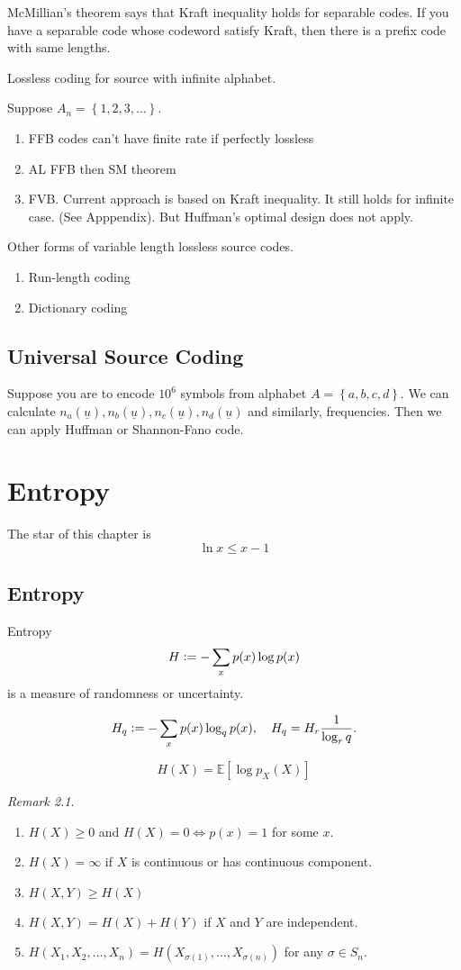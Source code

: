 \documentclass{report}
\newcommand{\set}[1]{\left\lbrace #1 \right\rbrace}
\newcommand{\defeq}{\vcentcolon=}
\theoremstyle{definition}
\theoremstyle{remark}
\newtheorem*{remark}{Remark}
\numberwithin{equation}{section}
\begin{document}
McMillian's theorem says that Kraft inequality holds for separable codes. If you have a separable code whose codeword satisfy Kraft, then there is a prefix code with same lengths.

Lossless coding for source with infinite alphabet.

Suppose $A_n = \set{1, 2, 3, \ldots}$.
\begin{enumerate}
  \item FFB codes can't have finite rate if perfectly lossless
  \item AL FFB then SM theorem
  \item FVB. Current approach is based on Kraft inequality. It still holds for infinite case. (See Apppendix). But Huffman's optimal design does not apply.
\end{enumerate}

Other forms of variable length lossless source codes.
\begin{enumerate}
  \item Run-length coding
  \item Dictionary coding
\end{enumerate}

\section{Universal Source Coding}
Suppose you are to encode $10^6$ symbols from alphabet $A = \set{a, b, c, d}$. We can calculate $n_a(\underline{u}), n_b(\underline{u}), n_c(\underline{u}), n_d(\underline{u})$ and similarly, frequencies. Then we can apply Huffman or Shannon-Fano code.


\chapter{Entropy}
The star of this chapter is \[
  \ln x \leq x - 1  
\]

\section{Entropy}

Entropy \[
  H \defeq -\sum_{x} p(x)\log p(x)
\] is a measure of randomness or uncertainty.

\[
    H_q \defeq -\sum_{x} p(x)\log_q p(x),\quad H_q = H_r \frac{1}{\log_r q}.
\]

\[
  H(X) = \mathbb{E}[\log p_X(X)]  
\]
\begin{remark}
  \begin{enumerate}
    \item $H(X) \geq 0$ and $H(X) = 0 \iff p(x) = 1$ for some $x$.
    \item $H(X) = \infty$ if $X$ is continuous or has continuous component.
    \item $H(X, Y) \geq H(X)$ 
    \item $H(X, Y) = H(X) + H(Y)$ if $X$ and $Y$ are independent.
    \item $H(X_1, X_2, \ldots, X_n) = H(X_{\sigma(1)}, \ldots, X_{\sigma(n)})$ for any $\sigma \in S_n$.
  \end{enumerate}
\end{remark}
\end{document}
